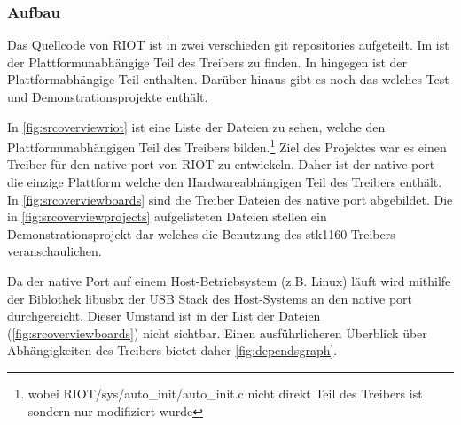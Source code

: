 \subsubsection{Aufbau}
Das Quellcode von RIOT ist in zwei verschieden git repositories aufgeteilt. Im 
\riotrepo{} ist der Plattformunabhängige Teil des Treibers zu finden. In \boardsrepo{} hingegen ist der Plattformabhängige Teil enthalten. Darüber hinaus gibt es noch das \projectsrepo{} welches Test- und Demonstrationsprojekte enthält.

In \autoref{fig:srcoverviewriot} ist eine Liste der Dateien zu sehen, welche den Plattformunabhängigen Teil des Treibers bilden.\footnote{wobei RIOT/sys/auto\_init/auto\_init.c nicht direkt Teil des Treibers ist sondern nur modifiziert wurde} Ziel des Projektes war es einen Treiber für den native port von RIOT zu entwickeln. Daher ist der native port die einzige Plattform welche den Hardwareabhängigen Teil des Treibers enthält. In \autoref{fig:srcoverviewboards} sind die Treiber Dateien des native port abgebildet. Die in \autoref{fig:srcoverviewprojects} aufgelisteten Dateien stellen ein Demonstrationsprojekt dar welches die Benutzung des stk1160 Treibers veranschaulichen. 

Da der native Port auf einem Host-Betriebsystem (z.B. Linux) läuft wird mithilfe der Biblothek libusbx der USB Stack des Host-Systems an den native port durchgereicht. Dieser Umstand ist in der List der Dateien (\autoref{fig:srcoverviewboards}) nicht sichtbar. Einen ausführlicheren Überblick über Abhängigkeiten des Treibers bietet daher \autoref{fig:dependsgraph}.

